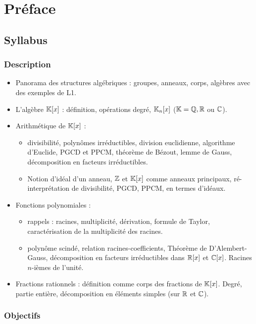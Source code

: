 
\chapter*{Préface}


\section*{Syllabus}

\subsection*{Description}

\begin{itemize}
	\item
	Panorama des structures algébriques : groupes, anneaux, corps, algèbres avec des exemples de L1.
	\item
	L'algèbre $\mathbb{K}[x]$ : définition, opérations degré, $\mathbb{K}_n[x]$ ($\mathbb{K} = \mathbb{Q}, \mathbb{R}$ ou $\mathbb{C}$).
	\item
	Arithmétique de $\mathbb{K}[x]$ :
	\begin{itemize}
		\item
		divisibilité, polynômes irréductibles, division euclidienne, algorithme d'Euclide, PGCD et PPCM, théorème de Bézout,
		lemme de Gauss, décomposition en facteurs irréductibles.
		\item
		Notion d'idéal d'un anneau, $\mathbb{Z}$ et $\mathbb{K}[x]$ comme anneaux principaux, ré-interprétation de divisibilité, PGCD, PPCM, en termes d'idéaux.
	\end{itemize}
	\item
	Fonctions polynomiales :
	\begin{itemize}
		\item
		rappels : racines, multiplicité, dérivation, formule de Taylor, caractérisation de la multiplicité des racines.
		\item
		polynôme scindé, relation racines-coefficients, Théorème de D'Alembert-Gauss, décomposition en facteurs irréductibles dans $\mathbb{R}[x]$ et $\mathbb{C}[x]$. 
		Racines $n$-ièmes de l'unité.
	\end{itemize}
	\item
	Fractions rationnels : définition comme corps des fractions de $\mathbb{K}[x]$.
	Degré, partie entière, décomposition en éléments simples (sur $\mathbb{R}$ et $\mathbb{C}$).
\end{itemize}

\subsection*{Objectifs}

